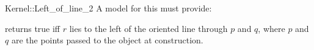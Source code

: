 \begin{ccRefFunctionObjectConcept}{Kernel::Left_of_line_2}
A model for this must provide:


{}
 
{returns true iff $r$ lies to the left of the oriented line 
through $p$ and $q$, where $p$ and $q$ are the points passed
to the object at construction.}

\end{ccRefFunctionObjectConcept}
